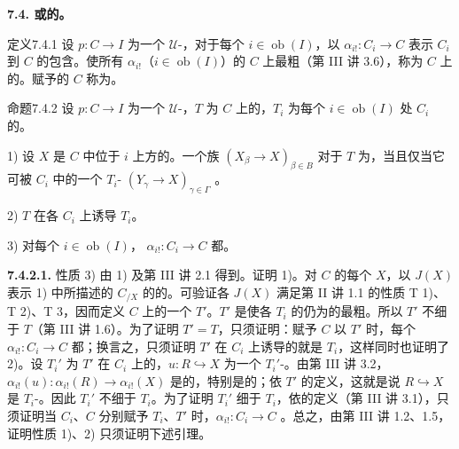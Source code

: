 \textbf{7.4. 或的。}
\begin{SGAresult}{定义}{7.4.1}
设 $p:C\to I$ 为一个 $\mathcal U$-，对于每个 $i\in\operatorname{ob}(I)$，以 $\alpha_{i!}:C_i\to C$ 表示 $C_i$ 到 $C$ 的包含。使所有 $\alpha_{i!}$（$i\in\operatorname{ob}(I)$）的 $C$ 上最粗（第 III 讲 3.6），称为 $C$ 上的。赋予的 $C$ 称为。
\end{SGAresult}
\begin{SGAresult}{命题}{7.4.2}
设 $p:C\to I$ 为一个 $\mathcal U$-，$T$ 为 $C$ 上的，$T_i$ 为每个 $i\in\operatorname{ob}(I)$ 处 $C_i$ 的。

1) 设 $X$ 是 $C$ 中位于 $i$ 上方的。一个族 $(X_\beta\to X)_{\beta\in B}$ 对于 $T$ 为，当且仅当它可被 $C_i$ 中的一个 $T_i$- $(Y_\gamma\to X)_{\gamma\in\Gamma}$ 。

2)  $T$ 在各 $C_i$ 上诱导 $T_i$。

3) 对每个 $i\in\operatorname{ob}(I)$， $\alpha_{i!}:C_i\to C$ 都。
\end{SGAresult}
\textbf{7.4.2.1.} 性质 3) 由 1) 及第 III 讲 2.1 得到。证明 1)。对 $C$ 的每个 $X$，以 $J(X)$ 表示 1) 中所描述的 $C_{/X}$ 的的。可验证各 $J(X)$ 满足第 II 讲 1.1 的性质 T 1)、T 2)、T 3，因而定义 $C$ 上的一个 $T'$。$T'$ 是使各 $T_i$ 的仍为的最粗。所以 $T'$ 不细于 $T$（第 III 讲 1.6）。为了证明 $T'=T$，只须证明：赋予 $C$ 以 $T'$ 时，每个 $\alpha_{i!}:C_i\to C$ 都；换言之，只须证明 $T'$ 在 $C_i$ 上诱导的就是 $T_i$，这样同时也证明了 2)。设 $T_i'$ 为 $T'$ 在 $C_i$ 上的，$u:R\hookrightarrow X$ 为一个 $T_i'$-。由第 III 讲 3.2， $\alpha_{i!}(u):\alpha_{i!}(R)\to\alpha_{i!}(X)$ 是的，特别是的；依 $T'$ 的定义，这就是说 $R\hookrightarrow X$ 是 $T_i$-。因此 $T_i'$ 不细于 $T_i$。为了证明 $T_i'$ 细于 $T_i$，依的定义（第 III 讲 3.1），只须证明当 $C_i$、$C$ 分别赋予 $T_i$、$T'$ 时，$\alpha_{i!}:C_i\to C$ 。总之，由第 III 讲 1.2、1.5，证明性质 1)、2) 只须证明下述引理。

